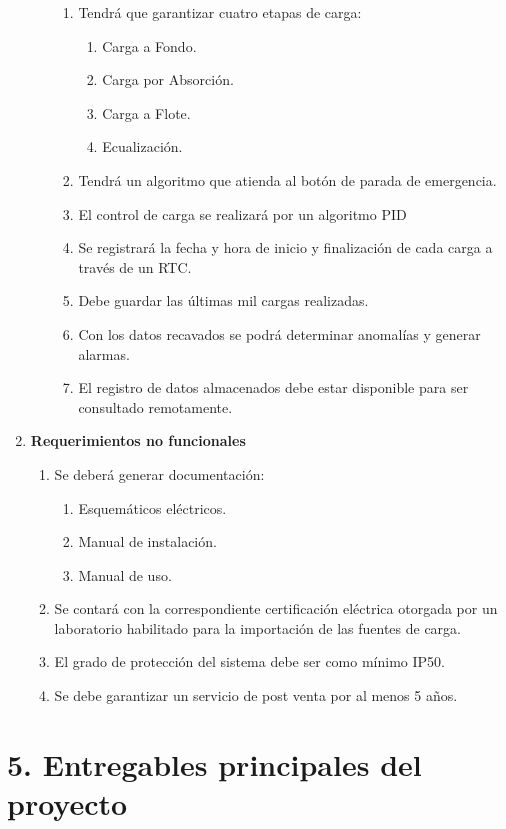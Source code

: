 \documentclass[11pt]{charter}
\begin{document}
\begin{enumerate}
\begin{enumerate}[label*=\arabic*.]
\begin{enumerate}[label*=\arabic*.]
				\item Tendrá que garantizar cuatro etapas de carga:
					\begin{enumerate}[label*=\arabic*.]
						\item Carga a Fondo.
						\item Carga por Absorción.
						\item Carga a Flote.
						\item Ecualización.
					\end{enumerate}
				\item Tendrá un algoritmo que atienda al botón de parada de emergencia.
				\item El control de carga se realizará por un algoritmo PID
				\item Se registrará la fecha y hora de inicio y finalización de cada carga a través de un RTC.
				\item Debe guardar las últimas mil cargas realizadas.
				\item Con los datos recavados se podrá determinar anomalías y generar alarmas. 
				\item El registro de datos almacenados debe estar disponible para ser consultado remotamente.
			\end{enumerate}					
	\end{enumerate}
	\item \textbf{Requerimientos no funcionales}
	\begin{enumerate}[label*=\arabic*.]
		\item Se deberá generar documentación:
			\begin{enumerate}[label*=\arabic*.]
				\item Esquemáticos eléctricos.
				\item Manual de instalación.
				\item Manual de uso.
			\end{enumerate}
		\item Se contará con la correspondiente certificación eléctrica otorgada por un laboratorio habilitado para la importación de las fuentes de carga.
		\item El grado de protección del sistema debe ser como mínimo IP50.
		\item Se debe garantizar un servicio de post venta por al menos 5 años.
	\end{enumerate}
\end{enumerate}


\section{5. Entregables principales del proyecto}
\label{sec:entregables}
\end{document}
